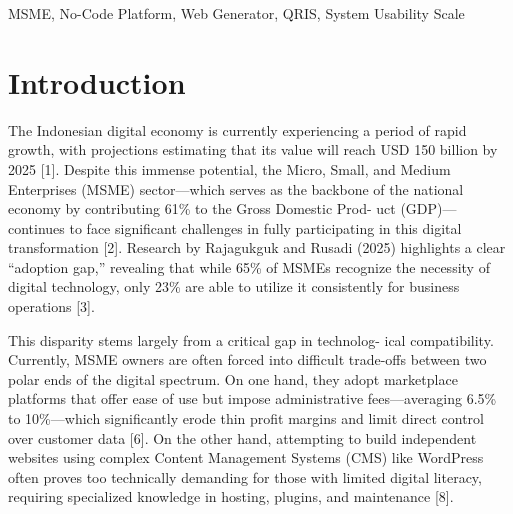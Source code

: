 \documentclass[conference]{IEEEtran}
\begin{document}
\begin{abstract} 

The Micro, Small, and Medium Enterprises (MSME) sector plays a crucial role in the Indonesian economy but faces significant barriers in digital adoption due to the technical complexity of traditional Content Management Systems and the high fees of marketplace platforms. Furthermore, global website builders often lack native integration with local digital habits, such as QRIS payments and WhatsApp communication. This study aims to bridge this gap by developing ”MyLinx” a localized no-code web generator tailored for Indonesian MSMEs using a User-Centered Design (UCD) approach. Initial requirements were gathered from 34 MSME owners, followed by system development and a pilot implementation involving 8 participants. The platform’s usability was evaluated using the System Usability Scale (SUS), yielding an average score of 85.0 (Excellent/Acceptable). The findings indicate that a localized no- code architecture significantly reduces the technical barrier to entry, offering MSMEs an intuitive, cost-effective, and culturally relevant tool to establish a professional digital presence.

\end{abstract}


\begin{IEEEkeywords}
 MSME, No-Code Platform, Web Generator, QRIS, System Usability Scale
\end{IEEEkeywords}

\section{Introduction}
The Indonesian digital economy is currently experiencing a period of rapid growth, with projections estimating that its value will reach USD 150 billion by 2025 [1]. Despite this immense potential, the Micro, Small, and Medium Enterprises (MSME) sector—which serves as the backbone of the national economy by contributing 61\% to the Gross Domestic Prod- uct (GDP)—continues to face significant challenges in fully participating in this digital transformation [2]. Research by Rajagukguk and Rusadi (2025) highlights a clear “adoption gap,” revealing that while 65\% of MSMEs recognize the necessity of digital technology, only 23\% are able to utilize it consistently for business operations [3].

This disparity stems largely from a critical gap in technolog- ical compatibility. Currently, MSME owners are often forced into difficult trade-offs between two polar ends of the digital spectrum. On one hand, they adopt marketplace platforms that offer ease of use but impose administrative fees—averaging 6.5\% to 10\%—which significantly erode thin profit margins and limit direct control over customer data [6]. On the other hand, attempting to build independent websites using complex Content Management Systems (CMS) like WordPress often proves too technically demanding for those with limited digital literacy, requiring specialized knowledge in hosting, plugins, and maintenance [8].
\end{document}
